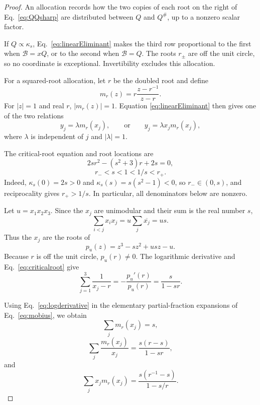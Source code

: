 \documentclass[aps,prx,reprint,nofootinbib,twoside,superscriptaddress,longbibliography,floatfix]{revtex4-2}
\theoremstyle{definition}
\begin{document}
\begin{proof}
An allocation records how the two copies of each root on the right of Eq.~\eqref{eq:QQsharp} are distributed between $Q$ and $Q^\#$, up to a nonzero scalar factor.

If $Q\propto\kappa_s$, Eq.~\eqref{eq:linearEliminant} makes the third row proportional to the first when $\mathcal B=xQ$, or to the second when $\mathcal B=Q$.  The roots $r_\pm$ are off the unit circle, so no coordinate is exceptional.  Invertibility excludes this allocation.

For a squared-root allocation, let $r$ be the doubled root and define
\begin{equation}
m_r(z)=r\frac{z-r^{-1}}{z-r}.
\label{eq:mobius}
\end{equation}
For $|z|=1$ and real $r$, $|m_r(z)|=1$.  Equation \eqref{eq:linearEliminant} then gives one of the two relations
\begin{equation}
y_j=\lambda m_r(x_j),
\qquad\text{or}\qquad
y_j=\lambda x_jm_r(x_j),
\label{eq:twoMobiusAllocations}
\end{equation}
where $\lambda$ is independent of $j$ and $|\lambda|=1$.

The critical-root equation and root locations are
\begin{equation}
2sr^2-(s^2+3)r+2s=0,
\label{eq:criticalroot}
\end{equation}
\begin{equation}
r_-<s<1<1/s<r_+.
\label{eq:rootlocations}
\end{equation}
Indeed, $\kappa_s(0)=2s>0$ and $\kappa_s(s)=s(s^2-1)<0$, so $r_-\in(0,s)$, and reciprocality gives $r_+>1/s$. In particular, all denominators below are nonzero.

Let $u=x_1x_2x_3$.  Since the $x_j$ are unimodular and their sum is the real number $s$,
\begin{equation}
\sum_{i<j}x_ix_j=u\sum_j\overline{x_j}=us.
\label{eq:secondsymmetric}
\end{equation}
Thus the $x_j$ are the roots of
\begin{equation}
p_u(z)=z^3-sz^2+usz-u.
\label{eq:pu}
\end{equation}
Because $r$ is off the unit circle, $p_u(r)\neq0$.  The logarithmic derivative and Eq.~\eqref{eq:criticalroot} give
\begin{equation}
\sum_{j=1}^3\frac{1}{x_j-r}
=-\frac{p_u'(r)}{p_u(r)}
=\frac{s}{1-sr}.
\label{eq:logderivative}
\end{equation}

Using Eq.~\eqref{eq:logderivative} in the elementary partial-fraction expansions of Eq.~\eqref{eq:mobius}, we obtain
\begin{equation}
\sum_jm_r(x_j)=s,
\label{eq:mobiusSum0}
\end{equation}
\begin{equation}
\sum_j\frac{m_r(x_j)}{x_j}
=\frac{s(r-s)}{1-sr},
\label{eq:mobiusSumMinus}
\end{equation}
and
\begin{equation}
\sum_jx_jm_r(x_j)
=\frac{s(r^{-1}-s)}{1-s/r}.
\label{eq:mobiusSumPlus}
\end{equation}


\end{proof}
\end{document}
